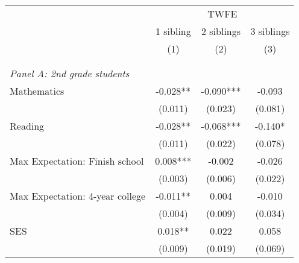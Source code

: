 \makeatletter
{}
{
\makeatother
\begin{tabular}{lccc}
\toprule
\cmidrule(lr){2-4}
& \multicolumn{3}{c}{TWFE}  \\
\cmidrule(lr){2-4}
& 1 sibling & 2 siblings & 3 siblings  \\
\cmidrule(lr){2-2} \cmidrule(lr){3-3} \cmidrule(lr){4-4}
& (1) & (2) & (3)\\
\bottomrule
&  &  &  \\
&  &  &   \\
\multicolumn{4}{l}{\textit{Panel A: 2nd grade students}} \\
\hspace{3mm}Mathematics&      -0.028** &      -0.090***&      -0.093   \\
                    &     (0.011)   &     (0.023)   &     (0.081)   \\
 
\hspace{3mm}Reading &      -0.028** &      -0.068***&      -0.140*  \\
                    &     (0.011)   &     (0.022)   &     (0.078)   \\
 
\hspace{3mm}Max Expectation: Finish school&       0.008***&      -0.002   &      -0.026   \\
                    &     (0.003)   &     (0.006)   &     (0.022)   \\
 
\hspace{3mm}Max Expectation: 4-year college&      -0.011** &       0.004   &      -0.010   \\
                    &     (0.004)   &     (0.009)   &     (0.034)   \\
 
\hspace{3mm}SES     &       0.018** &       0.022   &       0.058   \\
                    &     (0.009)   &     (0.019)   &     (0.069)   \\
 

\end{tabular}}
